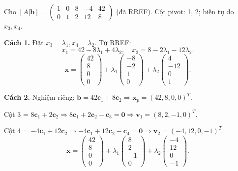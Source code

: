 \documentclass[12pt,a4paper]{article}
\begin{document}
\begin{vidu}[title={Ba cách tìm nghiệm trên cùng một bài toán}]
Cho $[A | \mathbf{b}] = \left(\begin{array}{cccc|c}1&0&8&-4&42\\ 0&1&2&12&8\end{array}\right)$ (đã RREF). Cột pivot: 1, 2; biến tự do $x_3, x_4$.

\medskip
\textbf{Cách 1.} Đặt $x_3=\lambda_1, x_4=\lambda_2$. Từ RREF:
\[
  x_1 = 42 - 8\lambda_1 + 4\lambda_2,\quad x_2 = 8 - 2\lambda_1 - 12\lambda_2.
\]
\[
  \mathbf{x} = \begin{pmatrix}42\\8\\0\\0\end{pmatrix} + \lambda_1\begin{pmatrix}-8\\-2\\1\\0\end{pmatrix} + \lambda_2\begin{pmatrix}4\\-12\\0\\1\end{pmatrix}.
\]

\medskip
\textbf{Cách 2.} Nghiệm riêng: $\mathbf{b} = 42\mathbf{c}_1 + 8\mathbf{c}_2 \Rightarrow \mathbf{x}_p = (42, 8, 0, 0)^T$.

Cột 3 = $8\mathbf{c}_1 + 2\mathbf{c}_2 \Rightarrow 8\mathbf{c}_1 + 2\mathbf{c}_2 - \mathbf{c}_3 = \mathbf{0} \Rightarrow \mathbf{v}_1 = (8, 2, -1, 0)^T$.

Cột 4 = $-4\mathbf{c}_1 + 12\mathbf{c}_2 \Rightarrow -4\mathbf{c}_1 + 12\mathbf{c}_2 - \mathbf{c}_4 = \mathbf{0} \Rightarrow \mathbf{v}_2 = (-4, 12, 0, -1)^T$.
\[
  \mathbf{x} = \begin{pmatrix}42\\8\\0\\0\end{pmatrix} + \lambda_1\begin{pmatrix}8\\2\\-1\\0\end{pmatrix} + \lambda_2\begin{pmatrix}-4\\12\\0\\-1\end{pmatrix}.
\]


\end{vidu}
\end{document}
